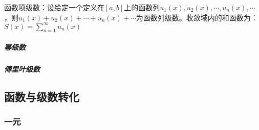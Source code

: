 \documentclass[12pt]{book}
\begin{document}
函数项级数：设给定一个定义在$[a,b]$上的函数列$u_1(x),u_2(x),\cdots,u_n(x),\cdots$，则$u_1(x)+u_2(x)+\cdots+u_n(x)+\cdots$为函数列级数。收敛域内的和函数为：$S(x)=\sum_{n=1}^{\infty}{ u_n(x) }$




\subparagraph{幂级数}


\subparagraph{傅里叶级数}



\subsection{函数与级数转化}

\subsubsection{一元}
\end{document}
